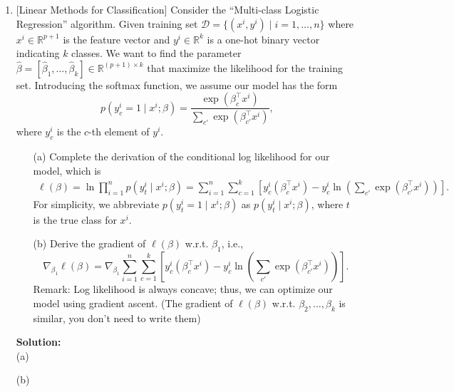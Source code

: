\documentclass[10pt]{article}
\begin{document}
\begin{enumerate}[1.]
	\item {} [Linear Methods for Classification] 
	Consider the ``Multi-class Logistic Regression'' algorithm. Given training set 
	$\mathcal{D}=\{(x^i,y^i)\mid i=1,\ldots,n\}$ where $x^i\in \mathbb{R}^{p+1}$ is the 
	feature vector and $y^i\in \mathbb{R}^{k}$ is a one-hot binary vector indicating 
	$k$ classes. We want to find the parameter $\hat{\beta}=[\hat{\beta}_1,\ldots,\hat{\beta}_k]\in \mathbb{R}^{(p+1)\times k}$ 
	that maximize the likelihood for the training set. Introducing the softmax 
	function, we assume our model has the form 
	\[
		p(y_c^i=1\mid x^i;\beta) = \frac{\exp(\beta_c^\top x^i)}{\sum_{c'}\exp(\beta_{c'}^\top x^i)},
	\]
	where $y_c^i$ is the $c$-th element of $y^i$.
		  \begin{itemize}
			\item[(a)] Complete the derivation of the conditional log likelihood for our model, which is
			\begin{align*}
				\ell(\beta) = \ln \prod_{i=1}^{n} p(y_t^i\mid x^i;\beta)
				=\sum_{i=1}^{n}\sum_{c=1}^{k}\left[ y_c^i(\beta_c^\top x^i) - y_c^i\ln \left(\sum_{c'}\exp(\beta_{c'}^\top x^i) \right)\right].
			\end{align*}
			For simplicity, we abbreviate $p(y_t^i=1\mid x^i;\beta)$ as $p(y_t^i\mid x^i;\beta)$, where 
			$t$ is the true class for $x^i$.~
			\item[(b)] Derive the gradient of $\ell(\beta)$ w.r.t. $\beta_1$, i.e., 
			\[
				\nabla_{\beta_1}\ell(\beta) = \nabla_{\beta_1} \sum_{i=1}^{n}\sum_{c=1}^{k}\left[ y_c^i(\beta_c^\top x^i) - y_c^i\ln \left(\sum_{c'}\exp(\beta_{c'}^\top x^i) \right)\right].
			\]
			Remark: Log likelihood is always concave; thus, we can optimize our model 
			using gradient ascent. (The gradient of $\ell(\beta)$ w.r.t. $\beta_2,\ldots,\beta_k$ is similar, you don't need to write them)~
		  \end{itemize}
		  \textbf{Solution:}\\
		  (a)






		  (b)







	      \newpage


\end{enumerate}
\end{document}
